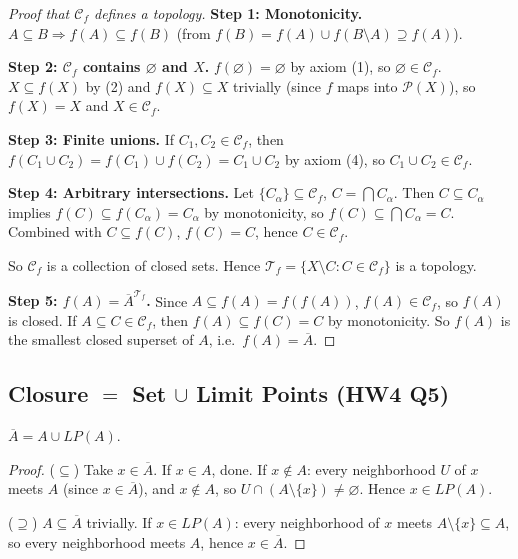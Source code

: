 \documentclass{article}
\begin{document}
\begin{proof}[Proof that $\mathcal{C}_f$ defines a topology]
  \textbf{Step 1: Monotonicity.} $A \subseteq B \Rightarrow f(A) \subseteq f(B)$
  (from $f(B) = f(A) \cup f(B \setminus A) \supseteq f(A)$).

  \textbf{Step 2: $\mathcal{C}_f$ contains $\varnothing$ and $X$.}
  $f(\varnothing) = \varnothing$ by axiom (1), so $\varnothing \in
  \mathcal{C}_f$.
  $X \subseteq f(X)$ by (2) and $f(X) \subseteq X$ trivially (since
  $f$ maps into $\mathcal{P}(X)$),
  so $f(X) = X$ and $X \in \mathcal{C}_f$.

  \textbf{Step 3: Finite unions.} If $C_1, C_2 \in \mathcal{C}_f$, then
  $f(C_1 \cup C_2) = f(C_1) \cup f(C_2) = C_1 \cup C_2$ by axiom (4),
  so $C_1 \cup C_2 \in \mathcal{C}_f$.

  \textbf{Step 4: Arbitrary intersections.} Let $\{C_\alpha\}
  \subseteq \mathcal{C}_f$,
  $C = \bigcap C_\alpha$. Then $C \subseteq C_\alpha$ implies $f(C)
  \subseteq f(C_\alpha) = C_\alpha$
  by monotonicity, so $f(C) \subseteq \bigcap C_\alpha = C$. Combined
  with $C \subseteq f(C)$,
  $f(C) = C$, hence $C \in \mathcal{C}_f$.

  So $\mathcal{C}_f$ is a collection of closed sets. Hence
  $\mathcal{T}_f = \{X \setminus C : C \in \mathcal{C}_f\}$ is a topology.

  \textbf{Step 5: $f(A) = \overline{A}^{\mathcal{T}_f}$.}
  Since $A \subseteq f(A) = f(f(A))$, $f(A) \in \mathcal{C}_f$, so
  $f(A)$ is closed.
  If $A \subseteq C \in \mathcal{C}_f$, then $f(A) \subseteq f(C) =
  C$ by monotonicity.
  So $f(A)$ is the smallest closed superset of $A$, i.e.\ $f(A) = \overline{A}$.
\end{proof}

\subsection{Closure $=$ Set $\cup$ Limit Points (HW4 Q5)}
\begin{theorem}
  $\overline{A} = A \cup LP(A)$.
\end{theorem}
\begin{proof}
  ($\subseteq$) Take $x \in \overline{A}$. If $x \in A$, done. If $x
  \notin A$: every neighborhood $U$ of $x$ meets $A$ (since $x \in
  \overline{A}$), and $x \notin A$, so $U \cap (A \setminus \{x\})
  \ne \varnothing$. Hence $x \in LP(A)$.

  ($\supseteq$) $A \subseteq \overline{A}$ trivially. If $x \in
  LP(A)$: every neighborhood of $x$ meets $A \setminus \{x\}
  \subseteq A$, so every neighborhood meets $A$, hence $x \in \overline{A}$.
\end{proof}
\end{document}
